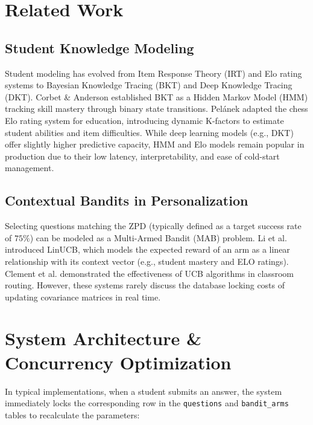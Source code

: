 \documentclass{article}
\begin{document}
\section{Related Work}

\subsection{Student Knowledge Modeling}
Student modeling has evolved from Item Response Theory (IRT) and Elo rating systems to Bayesian Knowledge Tracing (BKT) and Deep Knowledge Tracing (DKT). Corbet \& Anderson \cite{corbett1994knowledge} established BKT as a Hidden Markov Model (HMM) tracking skill mastery through binary state transitions. Pelánek \cite{pelanek2016applications} adapted the chess Elo rating system for education, introducing dynamic K-factors to estimate student abilities and item difficulties. While deep learning models (e.g., DKT) offer slightly higher predictive capacity, HMM and Elo models remain popular in production due to their low latency, interpretability, and ease of cold-start management.

\subsection{Contextual Bandits in Personalization}
Selecting questions matching the ZPD (typically defined as a target success rate of $75\%$) can be modeled as a Multi-Armed Bandit (MAB) problem. Li et al. \cite{li2010contextual} introduced LinUCB, which models the expected reward of an arm as a linear relationship with its context vector (e.g., student mastery and ELO ratings). Clement et al. \cite{clement2015multi} demonstrated the effectiveness of UCB algorithms in classroom routing. However, these systems rarely discuss the database locking costs of updating covariance matrices in real time.

\section{System Architecture \& Concurrency Optimization}

In typical implementations, when a student submits an answer, the system immediately locks the corresponding row in the \texttt{questions} and \texttt{bandit\_arms} tables to recalculate the parameters:

\begin{center}
\end{center}
\end{document}
